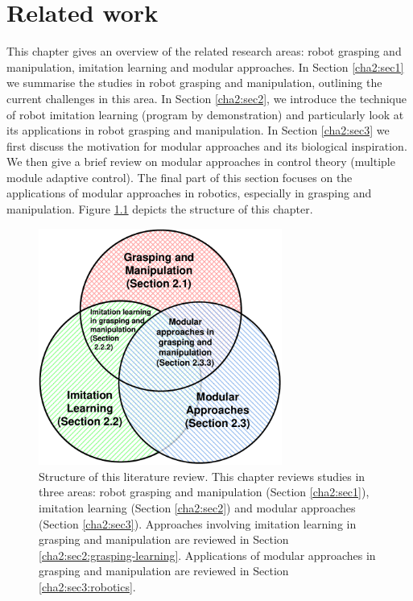 \chapter{Related work}
\label{cha2}

This chapter gives an overview of the related research areas: robot grasping and manipulation, imitation learning and modular approaches. In Section \ref{cha2:sec1} we summarise the studies in robot grasping and manipulation, outlining the current challenges in this area. In Section \ref{cha2:sec2}, we introduce the technique of robot imitation learning (program by demonstration) and particularly look at its applications in robot grasping and manipulation. In Section \ref{cha2:sec3} we first discuss the motivation for modular approaches and its biological inspiration. We then give a brief review on modular approaches in control theory (multiple module adaptive control). The final part of this section focuses on the applications of modular approaches in robotics, especially in grasping and manipulation. Figure \ref{fig:litreview} depicts the structure of this chapter.

\begin{figure}
\centering
  \includegraphics[width=8cm]{./fig_cha2/litreview.pdf}
  \caption{Structure of this literature review. This chapter reviews studies in three areas: robot grasping and manipulation (Section \ref{cha2:sec1}), imitation learning (Section \ref{cha2:sec2}) and modular approaches (Section \ref{cha2:sec3}). Approaches involving imitation learning in grasping and manipulation are reviewed in Section \ref{cha2:sec2:grasping-learning}. Applications of modular approaches in grasping and manipulation are reviewed in Section \ref{cha2:sec3:robotics}.}
  \label{fig:litreview}
\end{figure}




%
%
%





